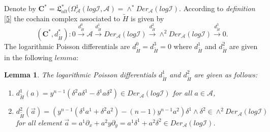 \documentclass[a4paper, 12pt,oneside,reqno]{amsart}
\newtheorem{lemma}[theorem]{Lemma}
\theoremstyle{definition}
\begin{document}
Denote by $\textbf{C}^{*}= \mathfrak{L}_{alt}^{*}(\Omega^{1}_{\mathcal{A}}(log\mathcal{I}, \mathcal{A}) = \wedge^{*}Der_{\mathcal{A}}(log \mathcal{I})$. According to  \textit{definition} \ref{5} the cochain complex associated to $\tilde{H}$ is given by
\begin{equation} 
(\textbf{C}^{*},d_{\tilde{H}}^{*}): 0\stackrel{d^{0}_{\tilde{H}}}{\longrightarrow}\mathcal{A}\stackrel{d^{1}_{\tilde{H}}}{\longrightarrow}Der_{\mathcal{A}}(log \mathcal{I})
     \stackrel{d^{2}_{\tilde{H}}}{\longrightarrow} \wedge^{2}Der_{\mathcal{A}}(log \mathcal{I}) \stackrel{d^{3}_{\tilde{H}}}{\longrightarrow} 0. \label{(5)}
\end{equation}     
      The logarithmic Poisson differentials are  $d^{0}_{\tilde{H}} = d^{3}_{\tilde{H}} = 0$ where $d^{1}_{\tilde{H}}$ and $d^{2}_{\tilde{H}}$ are given in the following $lemma$:
 \begin{lemma} \label{41}
 The logarithmic  Poisson differentials  $d^{1}_{\tilde{H}}$ and $d^{2}_{\tilde{H}}$ are given as follows:
 \begin{enumerate}
 \item[1.]  $d^{1}_{\tilde{H}}(a) = y^{n-1}(\delta^{2}a \delta^{1} - \delta^{1}a \delta^{2})\in Der_{\mathcal{A}}(log \mathcal{I})$ for all $a \in \mathcal{A}$,
 \item[2.]  
 $d^{2}_{\tilde{H}}(\overrightarrow{a}) = \left( y^{n-1}(\delta^{1}a^{1} + \delta^{2}a^{2} )-(n-1)y^{n-1}a^{2} \right) \delta^{1}\wedge \delta^{2} \in \wedge^{2}Der_{\mathcal{A}}(log \mathcal{I})$ for all element $\overrightarrow{a}= a^{1}\partial_{x} + a^{2} y\partial_{y}= a^{1}\delta^{1} + a^{2}\delta^{2} \in  Der_{\mathcal{A}}(log \mathcal{I})$.
 \end{enumerate}
 \end{lemma}
\end{document}
